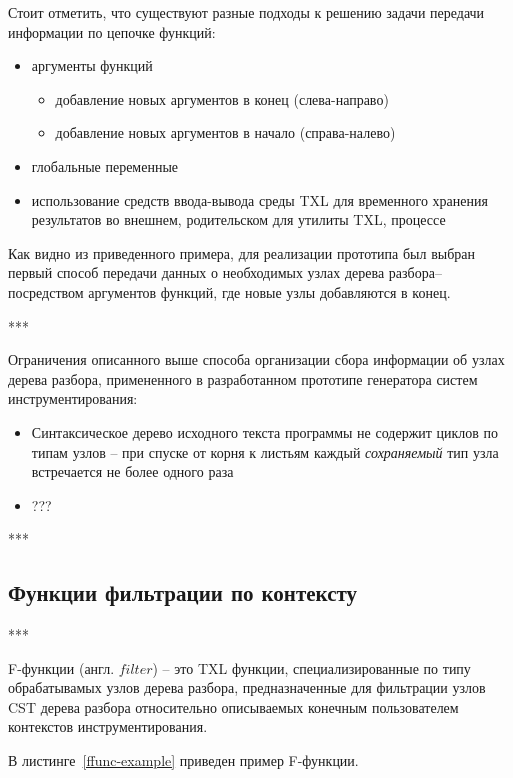 Стоит отметить, что существуют разные подходы к решению задачи передачи информации по цепочке функций:
\begin {itemize}[noitemsep]
  \item аргументы функций
    \begin{itemize}[noitemsep]
      \item добавление новых аргументов в конец (слева-направо)
      \item добавление новых аргументов в начало (справа-налево)
    \end{itemize}
  \item глобальные переменные
  \item использование средств ввода-вывода среды TXL для временного хранения результатов во внешнем, родительском для утилиты TXL, процессе
\end{itemize}

Как видно из приведенного примера, для реализации прототипа был выбран первый способ передачи данных о необходимых узлах дерева разбора-- посредством аргументов функций, где новые узлы добавляются в конец.

***

Ограничения описанного выше способа организации сбора информации об узлах дерева разбора, примененного в разработанном прототипе генератора систем инструментирования:
\begin{itemize}[noitemsep]
  \item Синтаксическое дерево исходного текста программы не содержит циклов по типам узлов -- при спуске от корня к листьям каждый \textit{сохраняемый} тип узла встречается не более одного раза
  \item ???
\end{itemize}

***

\subsection{Функции фильтрации по контексту}

***

F-функции (англ. $filter$) -- это TXL функции, специализированные по типу обрабатывамых узлов дерева разбора, предназначенные для фильтрации узлов CST дерева разбора относительно описываемых конечным пользователем контекстов инструментирования.

В листинге~\ref{ffunc-example} приведен пример F-функции.

